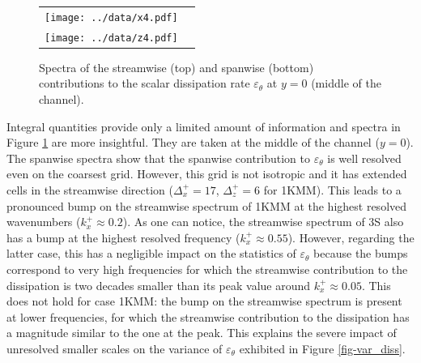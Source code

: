 \documentclass[review]{elsarticle}
\newcommand{\epst}{\varepsilon_\theta}
\begin{document}
\begin{figure}[htbp]
\begin{center}
\begin{tabular}{cc}
\texttt{[image: ../data/x4.pdf]} \\ 
\texttt{[image: ../data/z4.pdf]}
\end{tabular}
\end{center}
\caption{Spectra of the streamwise (top) and spanwise (bottom) contributions to the scalar dissipation rate $\epst$ at $y=0$ (middle of the channel).}
\label{fig-spec}
\end{figure}

Integral quantities provide only a limited amount of information and spectra in Figure \ref{fig-spec} are more insightful. They are taken at the middle of the channel ($y=0$). The spanwise spectra show that the spanwise contribution to $\epst$ is well resolved even on the coarsest grid. However, this grid is not isotropic and it has extended cells in the streamwise direction ($\Delta_x^+=17$, $\Delta_z^+=6$ for 1KMM). This leads to a pronounced bump on the streamwise spectrum of 1KMM at the highest resolved wavenumbers ($k_x^+\approx 0.2$). As one can notice, the streamwise spectrum of 3S also has a bump at the highest resolved frequency ($k_x^+\approx 0.55$). However, regarding the latter case, this has a negligible impact on the statistics of $\epst$ because the bumps correspond to very high frequencies for which the streamwise contribution to the dissipation is two decades smaller than its peak value around $k_x^+ \approx 0.05$. This does not hold for case 1KMM: the bump on the streamwise spectrum is present at lower frequencies, for which the streamwise contribution to the dissipation has a magnitude similar to the one at the peak. This explains the severe impact of {\color{red}unresolved} smaller scales on the variance of $\epst$ exhibited in  Figure \ref{fig-var_diss}.
\end{document}

